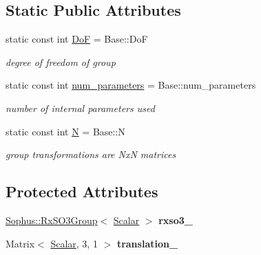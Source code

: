 \subsection*{Static Public Attributes}
\begin{DoxyCompactItemize}
\item 
static const int \hyperlink{class_sophus_1_1_sim3_group_ac073510c872e1fbbf0e0cf1ec0828f58}{DoF} = Base\+::\+DoF\hypertarget{class_sophus_1_1_sim3_group_ac073510c872e1fbbf0e0cf1ec0828f58}{}\label{class_sophus_1_1_sim3_group_ac073510c872e1fbbf0e0cf1ec0828f58}

\begin{DoxyCompactList}\small\item\em degree of freedom of group \end{DoxyCompactList}\item 
static const int \hyperlink{class_sophus_1_1_sim3_group_a00e6e0e97d7f40825215292fea37e9c4}{num\+\_\+parameters} = Base\+::num\+\_\+parameters\hypertarget{class_sophus_1_1_sim3_group_a00e6e0e97d7f40825215292fea37e9c4}{}\label{class_sophus_1_1_sim3_group_a00e6e0e97d7f40825215292fea37e9c4}

\begin{DoxyCompactList}\small\item\em number of internal parameters used \end{DoxyCompactList}\item 
static const int \hyperlink{class_sophus_1_1_sim3_group_ac7127f3be157379ee4c3e89030964791}{N} = Base\+::N\hypertarget{class_sophus_1_1_sim3_group_ac7127f3be157379ee4c3e89030964791}{}\label{class_sophus_1_1_sim3_group_ac7127f3be157379ee4c3e89030964791}

\begin{DoxyCompactList}\small\item\em group transformations are NxN matrices \end{DoxyCompactList}\end{DoxyCompactItemize}
\subsection*{Protected Attributes}
\begin{DoxyCompactItemize}
\item 
\hyperlink{class_sophus_1_1_rx_s_o3_group}{Sophus\+::\+Rx\+S\+O3\+Group}$<$ \hyperlink{class_sophus_1_1_sim3_group_a5db0ba2bb3fe2471006c9f366077c5bb}{Scalar} $>$ {\bfseries rxso3\+\_\+}\hypertarget{class_sophus_1_1_sim3_group_a5f13e46bdd9b164eb2922bab66f826ad}{}\label{class_sophus_1_1_sim3_group_a5f13e46bdd9b164eb2922bab66f826ad}

\item 
Matrix$<$ \hyperlink{class_sophus_1_1_sim3_group_a5db0ba2bb3fe2471006c9f366077c5bb}{Scalar}, 3, 1 $>$ {\bfseries translation\+\_\+}\hypertarget{class_sophus_1_1_sim3_group_a93fd08a5b0a4a2c3ecec7990c0c7c51c}{}\label{class_sophus_1_1_sim3_group_a93fd08a5b0a4a2c3ecec7990c0c7c51c}

\end{DoxyCompactItemize}

